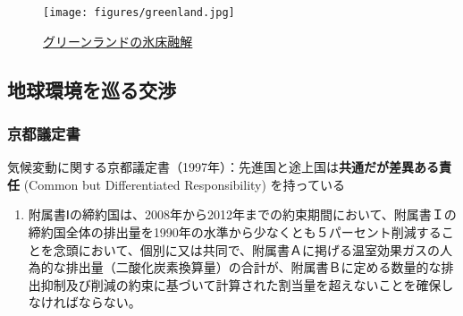 \documentclass[
  xelatex,
  ja=standard]{bxjsarticle}
\providecommand{\tightlist}{%
  \setlength{\itemsep}{0pt}\setlength{\parskip}{0pt}}\usepackage{longtable,booktabs,array}
\begin{document}
\begin{figure}[htpb]

{\centering \texttt{[image: figures/greenland.jpg]}

}

\caption{\href{https://commons.wikimedia.org/wiki/File:Greenland_Meltdown_08072012_12072012.jpg}{グリーンランドの氷床融解}}

\end{figure}

\hypertarget{ux5730ux7403ux74b0ux5883ux3092ux5de1ux308bux4ea4ux6e09}{%
\subsection{地球環境を巡る交渉}\label{ux5730ux7403ux74b0ux5883ux3092ux5de1ux308bux4ea4ux6e09}}

\hypertarget{ux4eacux90fdux8b70ux5b9aux66f8}{%
\subsubsection{京都議定書}\label{ux4eacux90fdux8b70ux5b9aux66f8}}

気候変動に関する京都議定書（1997年）：先進国と途上国は\textbf{共通だが差異ある責任}
(Common but Differentiated Responsibility) を持っている

\begin{tcolorbox}[enhanced jigsaw, left=2mm, arc=.35mm, breakable, coltitle=black, bottomtitle=1mm, toprule=.15mm, leftrule=.75mm, colbacktitle=quarto-callout-note-color!10!white, colback=white, colframe=quarto-callout-note-color-frame, bottomrule=.15mm, titlerule=0mm, toptitle=1mm, opacitybacktitle=0.6, opacityback=0, rightrule=.15mm, title=\textcolor{quarto-callout-note-color}{\faInfo}\hspace{0.5em}{\href{https://www.mofa.go.jp/mofaj/gaiko/treaty/treaty_020413.html}{気候変動に関する国際連合枠組条約の京都議定書}　第3条}]

\begin{enumerate}
\def\labelenumi{\arabic{enumi}.}
\tightlist
\item
  附属書Ⅰの締約国は、2008年から2012年までの約束期間において、附属書Ｉの締約国全体の排出量を1990年の水準から少なくとも５パーセント削減することを念頭において、個別に又は共同で、附属書Ａに掲げる温室効果ガスの人為的な排出量（二酸化炭素換算量）の合計が、附属書Ｂに定める数量的な排出抑制及び削減の約束に基づいて計算された割当量を超えないことを確保しなければならない。
\end{enumerate}

\end{tcolorbox}
\end{document}
